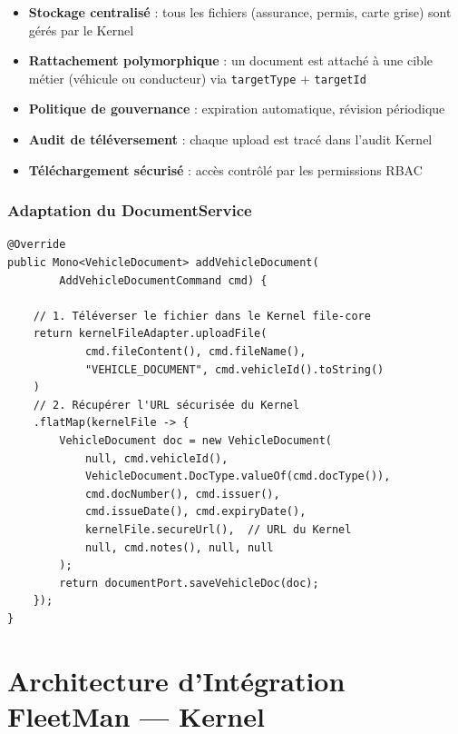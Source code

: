 \documentclass[12pt,a4paper]{report}
\begin{document}
\begin{itemize}[leftmargin=2cm]
  \item \textbf{Stockage centralisé} : tous les fichiers (assurance, permis, carte grise) sont gérés par le Kernel
  \item \textbf{Rattachement polymorphique} : un document est attaché à une cible métier (véhicule ou conducteur) via \texttt{targetType} + \texttt{targetId}
  \item \textbf{Politique de gouvernance} : expiration automatique, révision périodique
  \item \textbf{Audit de téléversement} : chaque upload est tracé dans l'audit Kernel
  \item \textbf{Téléchargement sécurisé} : accès contrôlé par les permissions RBAC
\end{itemize}

\subsection{Adaptation du DocumentService}

\begin{lstlisting}[style=javaStyle, caption={DocumentService enrichi avec file-core}]
@Override
public Mono<VehicleDocument> addVehicleDocument(
        AddVehicleDocumentCommand cmd) {

    // 1. Téléverser le fichier dans le Kernel file-core
    return kernelFileAdapter.uploadFile(
            cmd.fileContent(), cmd.fileName(),
            "VEHICLE_DOCUMENT", cmd.vehicleId().toString()
    )
    // 2. Récupérer l'URL sécurisée du Kernel
    .flatMap(kernelFile -> {
        VehicleDocument doc = new VehicleDocument(
            null, cmd.vehicleId(),
            VehicleDocument.DocType.valueOf(cmd.docType()),
            cmd.docNumber(), cmd.issuer(),
            cmd.issueDate(), cmd.expiryDate(),
            kernelFile.secureUrl(),  // URL du Kernel
            null, cmd.notes(), null, null
        );
        return documentPort.saveVehicleDoc(doc);
    });
}
\end{lstlisting}

\chapter{Architecture d'Intégration FleetMan — Kernel}
\end{document}
